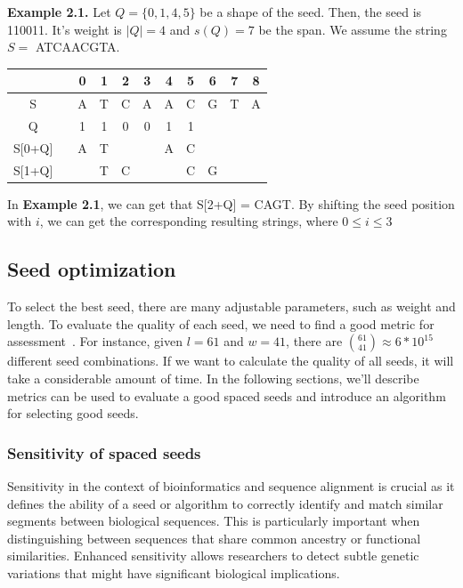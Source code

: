 \documentclass[PhD]{PHlab-thesis}
\begin{document}
\textbf{Example 2.1.} Let $Q=\{0, 1, 4, 5\}$ be a shape of the seed. Then, the seed is 110011. It's weight is $\left | Q \right | = 4$ and $s(Q)=7$ be the span. We assume the string $S=$ ATCAACGTA.
\vspace{2em}

\begin{center}   
\begin{tabular}{ccccccccccc}
 & & 0 & 1 & 2 & 3 & 4 & 5 & 6 & 7 & 8\\
 \midrule
S& & A & T & C & A & A & C & G & T & A\\
Q& & 1 & 1 & 0 & 0 & 1 & 1 \\
S[0+Q] & & A & T & & & A & C & &\\
S[1+Q] & & & T & C & & & C & G & &\\
\end{tabular}
\end{center}
\vspace{2em}

In \textbf{Example 2.1}, we can get that S[2+Q] = CAGT. By shifting the seed position with $i$, we can get the corresponding resulting strings, where $0\leq i\leq 3$

\subsection{Seed optimization}
To select the best seed, there are many adjustable parameters, such as weight and length. To evaluate the quality of each seed, we need to find a good metric for assessment~\cite{ChoiGoodSeed}. For instance, given $l=61$ and $w=41$, there are $\binom{61}{41} \approx 6 * 10^{15}$ different seed combinations. If we want to calculate the quality of all seeds, it will take a considerable amount of time. In the following sections, we'll describe metrics can be used to evaluate a good spaced seeds and introduce an algorithm for selecting good seeds.

\subsubsection{Sensitivity of spaced seeds}
Sensitivity in the context of bioinformatics and sequence alignment is crucial as it defines the ability of a seed or algorithm to correctly identify and match similar segments between biological sequences. This is particularly important when distinguishing between sequences that share common ancestry or functional similarities. Enhanced sensitivity allows researchers to detect subtle genetic variations that might have significant biological implications.
\end{document}
